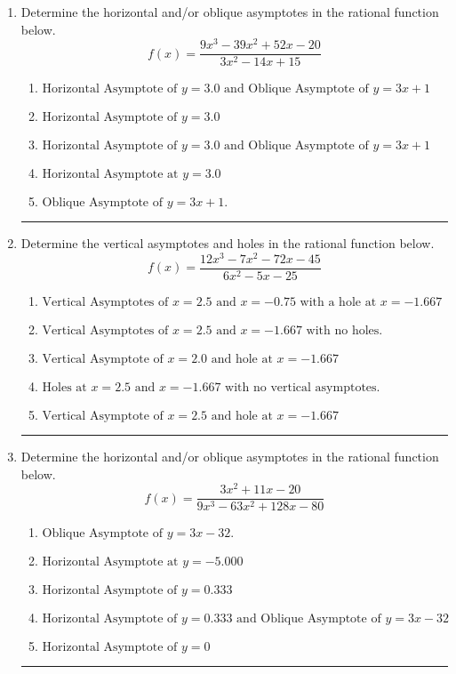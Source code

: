 \documentclass[14pt]{extbook}
\newcommand{\litem}[1]{\item#1\hspace*{-1cm}\rule{\textwidth}{0.4pt}}
\begin{document}
\begin{enumerate}
{\begin{enumerate}[label=\Alph*.]
\end{enumerate} }
\litem{
Determine the horizontal and/or oblique asymptotes in the rational function below.\[ f(x) = \frac{9x^{3} -39 x^{2} +52 x -20}{3x^{2} -14 x + 15} \]\begin{enumerate}[label=\Alph*.]
\item \( \text{Horizontal Asymptote of } y = 3.0 \text{ and Oblique Asymptote of } y = 3x + 1 \)
\item \( \text{Horizontal Asymptote of } y = 3.0  \)
\item \( \text{Horizontal Asymptote of } y = 3.0 \text{ and Oblique Asymptote of } y = 3x + 1 \)
\item \( \text{Horizontal Asymptote at } y = 3.0 \)
\item \( \text{Oblique Asymptote of } y = 3x + 1. \)

\end{enumerate} }
\litem{
Determine the vertical asymptotes and holes in the rational function below.\[ f(x) = \frac{12x^{3} -7 x^{2} -72 x -45}{6x^{2} -5 x -25} \]\begin{enumerate}[label=\Alph*.]
\item \( \text{Vertical Asymptotes of } x = 2.5 \text{ and } x = -0.75 \text{ with a hole at } x = -1.667 \)
\item \( \text{Vertical Asymptotes of } x = 2.5 \text{ and } x = -1.667 \text{ with no holes.} \)
\item \( \text{Vertical Asymptote of } x = 2.0 \text{ and hole at } x = -1.667 \)
\item \( \text{Holes at } x = 2.5 \text{ and } x = -1.667 \text{ with no vertical asymptotes.} \)
\item \( \text{Vertical Asymptote of } x = 2.5 \text{ and hole at } x = -1.667 \)

\end{enumerate} }
\litem{
Determine the horizontal and/or oblique asymptotes in the rational function below.\[ f(x) = \frac{3x^{2} +11 x -20}{9x^{3} -63 x^{2} +128 x -80} \]\begin{enumerate}[label=\Alph*.]
\item \( \text{Oblique Asymptote of } y = 3x -32. \)
\item \( \text{Horizontal Asymptote at } y = -5.000 \)
\item \( \text{Horizontal Asymptote of } y = 0.333  \)
\item \( \text{Horizontal Asymptote of } y = 0.333 \text{ and Oblique Asymptote of } y = 3x -32 \)
\item \( \text{Horizontal Asymptote of } y = 0 \)


\end{enumerate}}
\end{enumerate}
\end{document}
